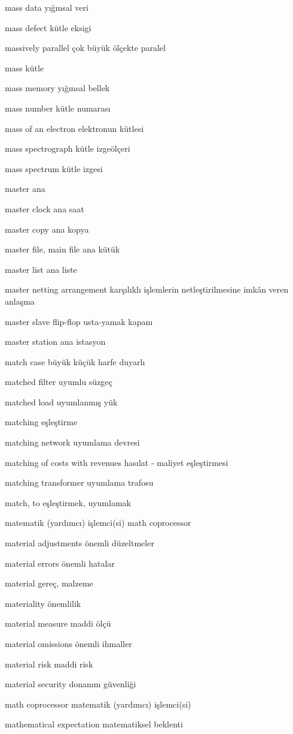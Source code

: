 \documentclass[12pt,fleqn]{article}\usepackage{../../common}
\begin{document}
mass data yığınsal veri

mass defect kütle eksigi

massively parallel çok büyük ölçekte paralel

mass kütle

mass memory yığınsal bellek

mass number kütle numarası

mass of an electron elektronun kütlesi

mass spectrograph kütle izgeölçeri

mass spectrum kütle izgesi

master ana

master clock ana saat

master copy ana kopya

master file, main file ana kütük

master list ana liste

master netting arrangement karşılıklı işlemlerin netleştirilmesine imkân veren anlaşma

master slave flip-flop usta-yamak kapanı

master station ana istasyon

match case büyük küçük harfe duyarlı

matched filter uyumlu süzgeç

matched load uyumlanmış yük

matching eşleştirme

matching network uyumlama devresi

matching of costs with revenues hasılat - maliyet eşleştirmesi

matching transformer uyumlama trafosu

match, to eşleştirmek, uyumlamak

matematik (yardımcı) işlemci(si) math coprocessor

material adjustments önemli düzeltmeler

material errors önemli hatalar

material gereç, malzeme

materiality önemlilik

material measure maddi ölçü

material omissions önemli ihmaller

material risk maddi risk

material security donanım güvenliği

math coprocessor matematik (yardımcı) işlemci(si)

mathematical expectation matematiksel beklenti
\end{document}
